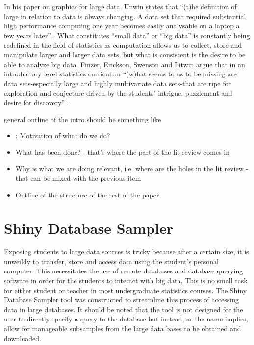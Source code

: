 \documentclass{article}\usepackage[]{graphicx}\usepackage[]{color}
\newcommand{\hh}[1]{{\color{ForestGreen} #1}}
\newcommand{\km}[1]{{\color{Orange} #1}}
\begin{document}
In his paper on graphics for large data, Unwin states that ``(t)he definition of large in relation to data is always changing. A data set that required substantial high performance computing one year becomes easily analysable on a laptop a few years later'' \citep[][p.~129]{Unwin1999}. What constitutes ``small data'' or ``big data'' is constantly being redefined in the field of statistics as computation allows us to collect, store and manipulate larger and larger data sets, but what is consistent is the desire to be able to analyze big data.  Finzer, Erickson, Swenson and Litwin argue that in an introductory level statistics curriculum ``(w)hat seems to us to be missing are data sets-especially large and highly multivariate data sets-that are ripe for exploration and conjecture driven by the students' intrigue, puzzlement and desire for discovery'' \citep[][p.~1]{Finzer2007}.\\

\hh{general outline of the intro should be something like
\begin{itemize}
\item: Motivation of what do we do?
\item What has been done? - that's where the part of the lit review comes in
\item Why is what we are doing relevant, i.e. where are the holes in the lit review - that can be mixed with the previous item
\item Outline of the structure of the rest of the paper
\end{itemize}}

\section{Shiny Database Sampler}

\km{  Exposing students to large data sources is tricky because after a certain size, it is unweildy to transfer, store and access data using the student's personal computer.  This necessitates the use of remote databases and database querying software in order for the students to interact with big data.  This is no small task for either student or teacher in most undergraduate statistics courses.  The Shiny Database Sampler tool was constructed to streamline this process of accessing data in large databases.  It should be noted that the tool is not designed for the user to directly specify a query to the database but instead, as the name implies, allow for manageable subsamples from the large data bases to be obtained and downloaded. \\  }
\end{document}
